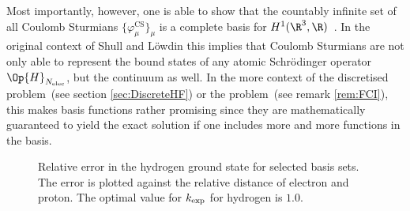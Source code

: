 Most importantly, however, one is able to show
that the countably infinite set of all Coulomb Sturmians $\{\varphi^\text{CS}_\mu\}_{\mu}$
is a complete basis for $H^1(\R^3, \R)$~\cite[Theorem 2.3.4]{Avery2008}.
In the original context of Shull and Löwdin this implies that Coulomb Sturmians
are not only able to represent the bound states
of any atomic Schrödinger operator $\Op{H}_{\Nelec}$,
but the continuum as well.
In the more context of the discretised \HF problem~(see section \ref{sec:DiscreteHF})
or the \FCI problem~(see remark \ref{rem:FCI}),
this makes \CS basis functions rather promising since
they are mathematically guaranteed to yield the exact solution if one includes
more and more \CS functions in the basis.

\begin{figure}[t]
	\centering
	\caption[
		Relative error in the hydrogen \HF ground state
		for selected \CS basis sets.
	]
	{Relative error in the hydrogen \HF ground state
		for selected \CS basis sets.
		The error is plotted against
		the relative distance of electron and proton.
		The optimal value for $k_\text{exp}$ for hydrogen is $1.0$.
	}
	\label{fig:RelativeErrorCS}
\end{figure}

